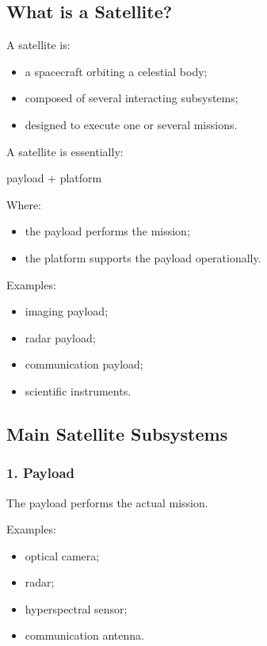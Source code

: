 \documentclass[10pt,a4paper,twocolumn]{article}
\begin{document}
\subsection{What is a Satellite?}

A satellite is:
\begin{itemize}
    \item a spacecraft orbiting a celestial body;
    \item composed of several interacting subsystems;
    \item designed to execute one or several missions.
\end{itemize}

A satellite is essentially:
\begin{center}
    payload + platform
\end{center}

Where:
\begin{itemize}
    \item the payload performs the mission;
    \item the platform supports the payload operationally.
\end{itemize}

Examples:
\begin{itemize}
    \item imaging payload;
    \item radar payload;
    \item communication payload;
    \item scientific instruments.
\end{itemize}


\subsection{Main Satellite Subsystems}


\subsubsection*{1. Payload}

The payload performs the actual mission.

Examples:
\begin{itemize}
    \item optical camera;
    \item radar;
    \item hyperspectral sensor;
    \item communication antenna.
\end{itemize}
\end{document}

